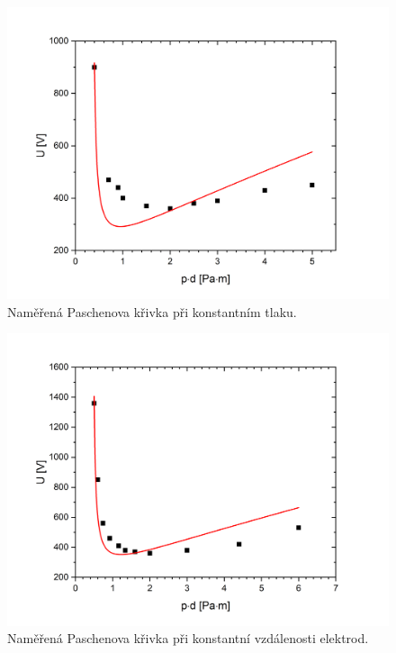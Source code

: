 \documentclass[a4paper,12pt]{article}
\begin{document}
\begin{figure}[h!]
	\centering
	\includegraphics[width=150mm]{tlakfixed.png}
	\caption{Naměřená Paschenova křivka při konstantním tlaku.}
	\label{tlakfixed}
\end{figure}


\begin{figure}[h!]
	\centering
	\includegraphics[width=150mm]{dfixed.png}
	\caption{Naměřená Paschenova křivka při konstantní vzdálenosti elektrod.}
	\label{dfixed}
\end{figure}

\clearpage
\end{document}
